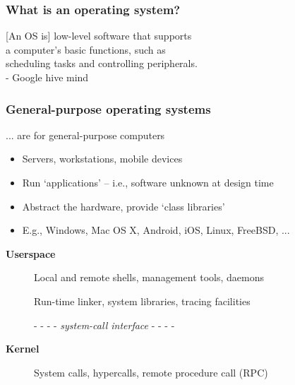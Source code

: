 \begin{frame}
  \frametitle{What is an operating system?}

  \begin{large}
  \begin{center}
    [An OS is] low-level software that supports \\
    a computer's basic functions, such as \\
    scheduling tasks and controlling peripherals. \\
  \smallskip
  \small{- Google hive mind}
  \end{center}
  \end{large}
\end{frame}

\begin{frame}
  \frametitle{General-purpose operating systems}

  ...  are for general-purpose computers

  \begin{itemize}
    \item Servers, workstations, mobile devices
    \item Run `applications' -- i.e., software unknown at design time
    \item Abstract the hardware, provide `class libraries'
    \item E.g., Windows, Mac OS X, Android, iOS, Linux, FreeBSD, ...
  \end{itemize}

  \pause

  \medskip

  \begin{description}
    \item[\textbf{Userspace}]

      \smallskip

      Local and remote shells, management tools, daemons

      \smallskip

      Run-time linker, system libraries, tracing facilities

    \pause

    \item[] {\tiny - - - - \textit{system-call interface} - - - -}

    \pause

    \item[\textbf{Kernel}]

      System calls, hypercalls, remote procedure call (RPC)


\end{description}
\end{frame}
